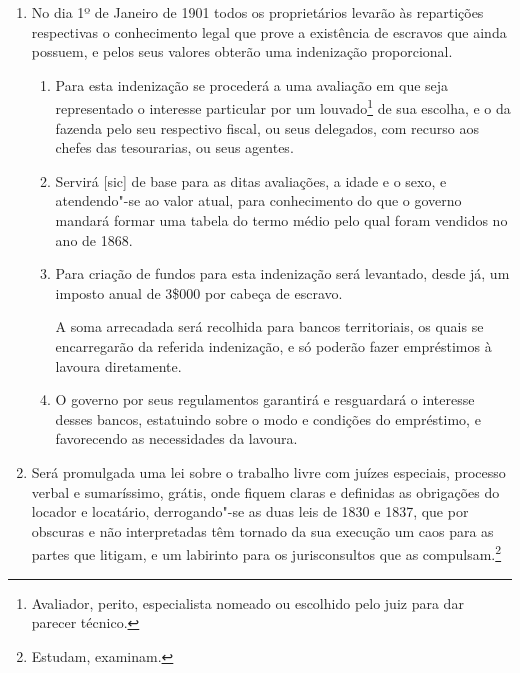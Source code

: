 \begin{enumerate}[label=Art. \arabic*º]
\begin{enumerate}[label=§ \arabic*º]
\item O proprietário que, dando parte do emancipamento\footnote{O
  mesmo que emancipação.} de um escravo, mostrar que o libertou na pia
batismal, poderá gozar de seus serviços até a idade de 15 anos, sendo,
porém, obrigado a mandar"-lhe ensinar, escrever e contar.
\end{enumerate}

\item No dia 1º de Janeiro de 1901 todos os proprietários levarão às
repartições respectivas o conhecimento legal que prove a existência de
escravos que ainda possuem, e pelos seus valores obterão uma indenização
proporcional.

\begin{enumerate}[label=§ \arabic*º]
\item Para esta indenização se procederá a uma avaliação em que seja
representado o interesse particular por um louvado\footnote{Avaliador,
  perito, especialista nomeado ou escolhido pelo juiz para dar parecer
  técnico.} de sua escolha, e o da fazenda pelo seu respectivo fiscal,
ou seus delegados, com recurso aos chefes das tesourarias, ou seus
agentes.

\item Servirá {[}sic{]} de base para as ditas avaliações, a idade e o
sexo, e atendendo"-se ao valor atual, para conhecimento do que o governo
mandará formar uma tabela do termo médio pelo qual foram vendidos no ano
de 1868.

\item Para criação de fundos para esta indenização será levantado, desde
já, um imposto anual de 3\$000 por cabeça de escravo.

A soma arrecadada será recolhida para bancos territoriais, os quais se
encarregarão da referida indenização, e só poderão fazer empréstimos à
lavoura diretamente.

\item O governo por seus regulamentos garantirá e resguardará o
interesse desses bancos, estatuindo sobre o modo e condições do
empréstimo, e favorecendo as necessidades da lavoura.
\end{enumerate}

\item Será promulgada uma lei sobre o trabalho livre com juízes
especiais, processo verbal e sumaríssimo, grátis, onde fiquem claras e
definidas as obrigações do locador e locatário, derrogando"-se as duas
leis de 1830 e 1837, que por obscuras e não interpretadas têm tornado da
sua execução um caos para as partes que litigam, e um labirinto para os
jurisconsultos que as compulsam.\footnote{Estudam, examinam.}


\end{enumerate}
